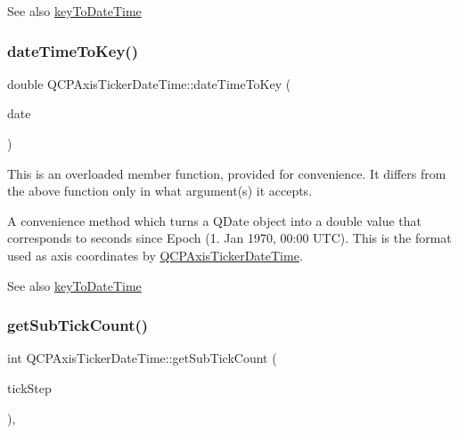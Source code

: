 \begin{DoxySeeAlso}{See also}
\mbox{\hyperlink{class_q_c_p_axis_ticker_date_time_a4c1761ad057f5564804a53f942629b53}{key\+To\+Date\+Time}} 
\end{DoxySeeAlso}
\mbox{\label{class_q_c_p_axis_ticker_date_time_ad87afc7dba65843f68da5ca88bc004f4}} 
\subsubsection{\texorpdfstring{dateTimeToKey()}{dateTimeToKey()}\hspace{0.1cm}{\footnotesize\ttfamily [2/2]}}
{\footnotesize\ttfamily double Q\+C\+P\+Axis\+Ticker\+Date\+Time\+::date\+Time\+To\+Key (\begin{DoxyParamCaption}\item[{const Q\+Date}]{date }\end{DoxyParamCaption})\hspace{0.3cm}{\ttfamily [static]}}

This is an overloaded member function, provided for convenience. It differs from the above function only in what argument(s) it accepts.

A convenience method which turns a Q\+Date object into a double value that corresponds to seconds since Epoch (1. Jan 1970, 00\+:00 U\+TC). This is the format used as axis coordinates by \mbox{\hyperlink{class_q_c_p_axis_ticker_date_time}{Q\+C\+P\+Axis\+Ticker\+Date\+Time}}.

\begin{DoxySeeAlso}{See also}
\mbox{\hyperlink{class_q_c_p_axis_ticker_date_time_a4c1761ad057f5564804a53f942629b53}{key\+To\+Date\+Time}} 
\end{DoxySeeAlso}
\mbox{\label{class_q_c_p_axis_ticker_date_time_a78dece0d51426a3c310528d413e09193}} 
\subsubsection{\texorpdfstring{getSubTickCount()}{getSubTickCount()}}
{\footnotesize\ttfamily int Q\+C\+P\+Axis\+Ticker\+Date\+Time\+::get\+Sub\+Tick\+Count (\begin{DoxyParamCaption}\item[{double}]{tick\+Step }\end{DoxyParamCaption})\hspace{0.3cm}{\ttfamily [protected]}, {\ttfamily [virtual]}}



